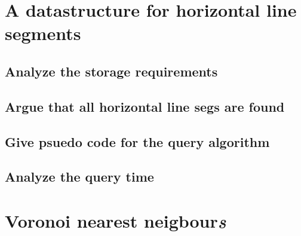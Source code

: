 \documentclass{article}
\begin{document}
\section{A datastructure for horizontal line segments}

\subsection{Analyze the storage requirements}
\subsection{Argue that all horizontal line segs are found}
\subsection{Give psuedo code for the query algorithm}

\subsection{Analyze the query time}

\section{Voronoi nearest neigbour\emph{s}}
\end{document}
